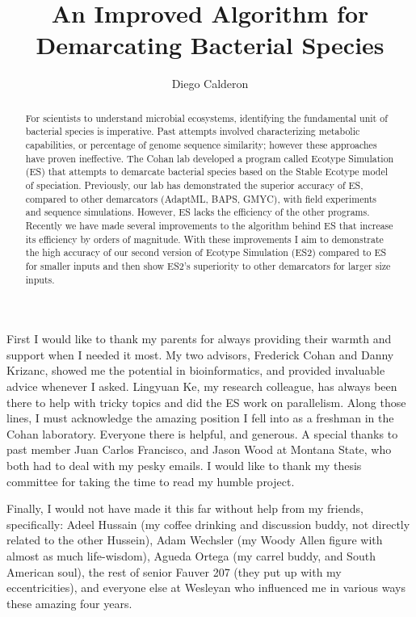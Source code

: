 \documentclass[11pt, final]{westhesis}
\title{An Improved Algorithm for Demarcating Bacterial Species}
\author{Diego Calderon}
\begin{document}

\begin{acknowledgements}
First I would like to thank my parents for always providing their warmth and support when I needed it most.
My two advisors, Frederick Cohan and Danny Krizanc, showed me the potential in bioinformatics, and provided invaluable advice whenever I asked.
Lingyuan Ke, my research colleague, has always been there to help with tricky topics and did the ES work on parallelism.
Along those lines, I must acknowledge the amazing position I fell into as a freshman in the Cohan laboratory.
Everyone there is helpful, and generous.
A special thanks to past member Juan Carlos Francisco, and Jason Wood at Montana State, who both had to deal with my pesky emails.
I would like to thank my thesis committee for taking the time to read my humble project.

Finally, I would not have made it this far without help from my friends, specifically: Adeel Hussain (my coffee drinking and discussion buddy, not directly related to the other Hussein), Adam Wechsler (my Woody Allen figure with almost as much life-wisdom), Agueda Ortega (my carrel buddy,  and South American soul), the rest of senior Fauver 207 (they put up with my eccentricities), and everyone else at Wesleyan who influenced me in various ways these amazing four years.
\end{acknowledgements}


\begin{abstract}
For scientists to understand microbial ecosystems, identifying the fundamental unit of bacterial species is imperative.
Past attempts involved characterizing metabolic capabilities, or percentage of genome sequence similarity; however these approaches have proven ineffective.
The Cohan lab developed a program called Ecotype Simulation (ES) that attempts to demarcate bacterial species based on the Stable Ecotype model of speciation.
Previously, our lab has demonstrated the superior accuracy of ES, compared to other demarcators (AdaptML, BAPS, GMYC), with field experiments and sequence simulations.
However, ES lacks the efficiency of the other programs.
Recently we have made several improvements to the algorithm behind ES that increase its efficiency by orders of magnitude.
With these improvements I aim to demonstrate the high accuracy of our second version of Ecotype Simulation (ES2) compared to ES for smaller inputs and then show ES2's superiority to other demarcators for larger size inputs.
\end{abstract}
\end{document}
